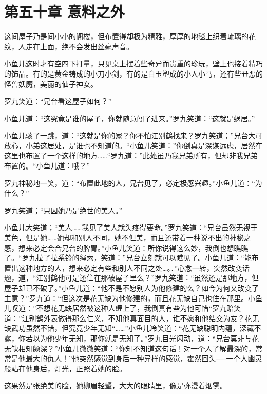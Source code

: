 \documentclass[12pt,oneside]{book}
\begin{document}
\hypertarget{ux7b2cux4e94ux5341ux7ae0-ux610fux6599ux4e4bux5916}{%
\chapter{第五十章
意料之外}\label{ux7b2cux4e94ux5341ux7ae0-ux610fux6599ux4e4bux5916}}

这间屋子乃是间小小的阁楼，但布置得却极为精雅，厚厚的地毯上织着琉璃的花纹，人走在上面，绝不会发出丝毫声音。

小鱼儿这时才有空四下打量，只见桌上摆着些奇异而贵重的珍玩，壁上也接着精巧的饰品。有的是黄金铸成的小刀小剑，有的是白玉塑成的小人小马，还有些丑恶的怪兽妖魔，美丽的仙子神女。

罗九笑道：``兄台看这屋子如何？''

小鱼儿道：``这究竟是谁的屋子，你就随意闯了进来。''罗九笑道：``这就是蜗居。''

小鱼儿骇了一跳，道：``这就是你的家？你不怕江别鹤找来？罗九笑道；''兄台大可放心，小弟这居处，是谁也不知道的。``小鱼儿笑道：''你倒真是深谋远虑，居然在这里也布置了一个这样的地方\ldots\ldots{}``罗九道：''此处虽乃我兄弟所有，但却非我兄弟布置的。``小鱼儿道：哦？''

罗九神秘地一笑，道：``布置此地的人，兄台见了，必定极感兴趣。''小鱼儿道：``为什么？''

罗九笑道；``只因她乃是绝世的美人。''

小鱼儿大笑道；``美人\ldots\ldots 我见了美人就头疼得要命。''罗九笑道：``兄台虽然无视于美色，但是她\ldots\ldots 她却和别人不同，她不但美，而且还带着一种说不出的神秘之感，想来必定会合兄台的脾胃。''小鱼儿笑道：所你说得这么妙，我倒也想瞧瞧了。``罗九拉了拉系铃的绳索，笑道：''兄台立刻就可以瞧见了。小鱼儿道：``能布置出这种地方的人，想来必定有些和别人不同之处\ldots。．''心念一转，突然改变话题，道，``江别鹤他可是还住在那破屋子里么？''罗九笑道：``虽然还是那地方，但屋子却已不破了。''小鱼儿道：``他不是不愿别人为他修建的么？如今为何又改变了主意？''罗九道：``但这次是花无缺为他修建的，而且花无缺自己也住在那里。小鱼儿叹道：''不想花无缺居然被这种人缠上了，我倒真有些为他可惜``罗九赔笑道：''江别鹤外表做得那么仁义，不知他真面目的人，谁不愿和他结交为友？花无缺武功虽然不错，但究竟少年无知``\ldots\ldots{}''小鱼儿冷笑道：``花无缺聪明内蕴，深藏不露，你若以为他少年无知，那你就是无知了。''罗九目光闪动，道：``兄台莫非与花无缺相知颇深？''小鱼儿微微笑道：``你知不知道这句话！对一个人了解最深的，常常是他最大的仇人！''他突然感觉到身后一种异样的感觉，霍然回头──一个人幽灵般站在他身后，灯光，正照着她的脸。

这果然是张绝美的脸，她柳眉轻颦，大大的眼睛里，像是弥漫着烟雾。
\end{document}
